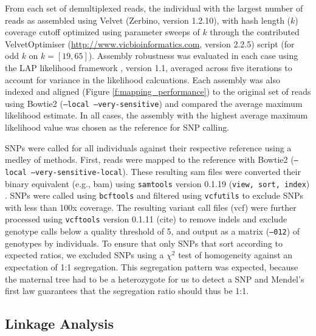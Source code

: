 \documentclass[11pt]{article}
\begin{document}
From each set of demultiplexed reads, the individual with the largest number of reads as assembled using 
Velvet (Zerbino, version 1.2.10), with hash length ($k$) coverage cutoff optimized using parameter sweeps of $k$ 
through the contributed VelvetOptimiser (\url{http://www.vicbioinformatics.com}, version 2.2.5) 
script (for odd $k$ on $k=[19,65]$).  Assembly robustness was evaluated in each case using the LAP likelihood 
framework \citep{Ghodsi:2013bc}, version 1.1, averaged across five iterations to account for variance 
in the likelihood calcuations.  Each assembly was also indexed and aligned (Figure \ref{f:mapping_performance}) 
to the original set of reads 
using Bowtie2 \citep{Langmead:2012jh} (\texttt{--local --very-sensitive}) and compared the average maximum 
likelihood estimate. In all cases, the assembly with the highest average maximum likelihood value was 
chosen as the reference for SNP calling.

SNPs were called for all individuals against their respective reference using a medley of methods.  First, 
reads were mapped to the reference with Bowtie2 (\texttt{--local --very-sensitive-local}).  These resulting 
sam files were converted their binary equivalent (e.g., bam) using \texttt{samtools} version 0.1.19 
(\texttt{view, sort, index}) \citep{Li:2009ka}.  SNPs were called using \texttt{bcftools} and filtered using 
\texttt{vcfutils} to exclude SNPs with less than 100x coverage. The resulting variant call files (vcf) 
were further processed using \texttt{vcftools} version 0.1.11 (cite) to remove indels and exclude genotype 
calls below a quality threshold of 5, and output as a matrix (\texttt{--012}) of genotypes by individuals.  
To ensure that only SNPs that sort according to expected ratios, we excluded SNPs using a $\chi^2$ test of 
homogeneity against an expectation of 1:1 segregation. This segregation pattern was expected, because
the maternal tree had to be a heterozygote for us to detect a SNP and Mendel's first law guarantees
that the segregation ratio should thus be 1:1.

\subsection*{Linkage Analysis}
\end{document}
